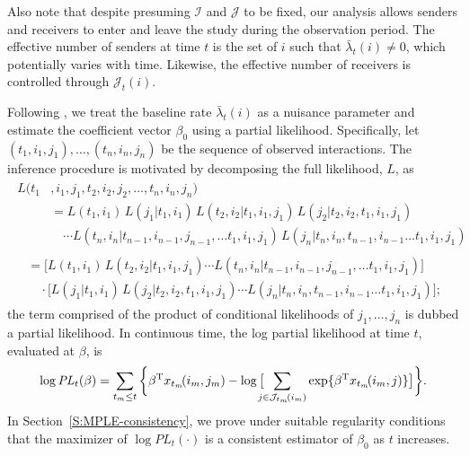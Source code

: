 \documentclass[final]{statsoc}
\begin{document}
Also note that despite presuming $\mathcal{I}$ and $\mathcal{J}$ to be fixed,
our analysis
allows senders and receivers to enter and leave the study during the
observation period.  The effective number of senders at time $t$ is the
set of $i$ such that $\bar \lambda_t(i) \neq 0$, which potentially varies
with time.  Likewise, the effective number of receivers is controlled through
$\mathcal{J}_t(i)$.

Following \citet{cox1975partial}, we treat the baseline rate
$\bar \lambda_t(i)$ as a nuisance parameter and estimate the coefficient
vector $\beta_0$ using a partial likelihood.  Specifically, let
$(t_1, i_1, j_1), \ldots, (t_n, i_n, j_n)$ be the sequence of observed
interactions.  The inference procedure is motivated by decomposing
the full likelihood, $L$, as
\begin{align*}
    \begin{split}
    L(t_1&, i_1, j_1, t_2, i_2, j_2, \ldots, t_n, i_n, j_n) \\
        &=
            L(t_1, i_1)
            \, L(j_1 | t_1, i_1)
            \, L(t_2, i_2 | t_1, i_1, j_1)
            \, L(j_2 | t_2, i_2, t_1, i_1, j_1) \\
        &\quad \cdots
            L(t_n, i_n | t_{n-1}, i_{n-1}, j_{n-1}, \ldots t_1, i_1, j_1)
            \, L(j_n | t_n, i_n, t_{n-1}, i_{n-1} \ldots t_1, i_1, j_1)
    \end{split} \\
    \begin{split}
        &=
            \Big[
                L(t_1, i_1)
                \, L(t_2, i_2 | t_1, i_1, j_1)
                \cdots
                L(t_n, i_n | t_{n-1}, i_{n-1}, j_{n-1}, \ldots t_1, i_1, j_1)
            \Big] \\
        &\quad
            \cdot
            \Big[
                L(j_1 | t_1, i_1)
                \, L(j_2 | t_2, i_2, t_1, i_1, j_1)
                \cdots
                L(j_n | t_n, i_n, t_{n-1}, i_{n-1} \ldots t_1, i_1, j_1)
            \Big];
    \end{split}
\end{align*}
the term comprised of the product of conditional likelihoods of $j_1,
\dotsc, j_n$ is dubbed a partial likelihood.  In continuous time,
the log partial likelihood at time $t$, evaluated at $\beta$, is
\begin{equation}\label{E:log-pl}
    \log
    \mathit{PL}_t(\beta)
        =
        \sum_{t_m \leq t}
        \bigg\{
            \beta^{\mathrm{T}} x_{t_m}\!(i_m, j_m)
            -
            \log\big[
                \!\!\!\!
                \sum_{j \in \mathcal{J}_{t_m}\!(i_m)}
                    \exp\{ \beta^{\mathrm{T}} x_{t_m}\!(i_m, j)\}
            \big]
        \bigg\}.
\end{equation}
In Section~\ref{S:MPLE-consistency}, we prove under suitable regularity
conditions that the maximizer of $\log \mathit{PL}_t(\cdot)$ is a
consistent estimator of $\beta_0$ as $t$ increases.
\end{document}
